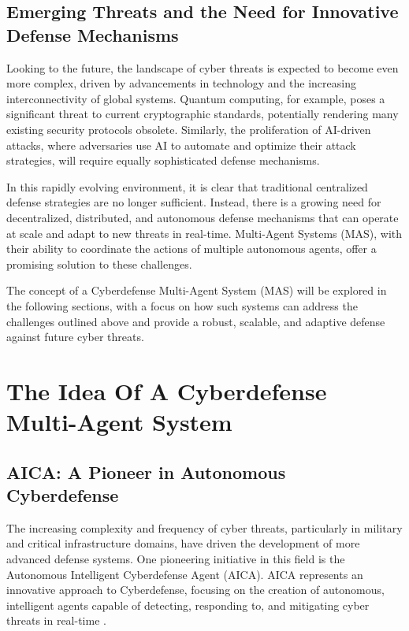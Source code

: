 \subsection{Emerging Threats and the Need for Innovative Defense Mechanisms}

Looking to the future, the landscape of cyber threats is expected to become even more complex, driven by advancements in technology and the increasing interconnectivity of global systems. Quantum computing, for example, poses a significant threat to current cryptographic standards, potentially rendering many existing security protocols obsolete\cite{mosca2018cybersecurity}\cite{bernstein2017post}. Similarly, the proliferation of AI-driven attacks, where adversaries use AI to automate and optimize their attack strategies, will require equally sophisticated defense mechanisms\cite{brundage2018malicious}.

In this rapidly evolving environment, it is clear that traditional centralized defense strategies are no longer sufficient. Instead, there is a growing need for decentralized, distributed, and autonomous defense mechanisms that can operate at scale and adapt to new threats in real-time\cite{moustafa2019holistic}. Multi-Agent Systems (MAS), with their ability to coordinate the actions of multiple autonomous agents, offer a promising solution to these challenges\cite{shakarian2015cyber}.

The concept of a Cyberdefense Multi-Agent System (MAS) will be explored in the following sections, with a focus on how such systems can address the challenges outlined above and provide a robust, scalable, and adaptive defense against future cyber threats\cite{kotenko2017cyber}.


\section{The Idea Of A Cyberdefense Multi-Agent System}

\subsection{AICA: A Pioneer in Autonomous Cyberdefense}

The increasing complexity and frequency of cyber threats, particularly in military and critical infrastructure domains, have driven the development of more advanced defense systems. One pioneering initiative in this field is the Autonomous Intelligent Cyberdefense Agent (AICA). AICA represents an innovative approach to Cyberdefense, focusing on the creation of autonomous, intelligent agents capable of detecting, responding to, and mitigating cyber threats in real-time \cite{jajodia2017autonomous}.

